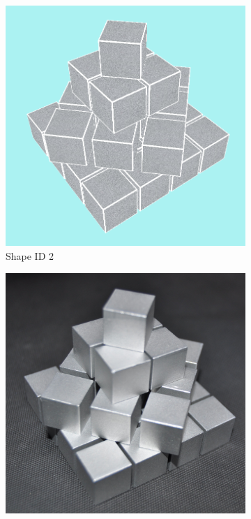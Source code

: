 \begin{figure}[!ht]
	\centering
	\begin{subfigure}{.29167\textwidth}
		\centering
		\includegraphics[width=.95\linewidth]{figures/qtp1-shape2-model.png}
		\caption{Shape ID 2}
		\label{fig:qtp1-shape2-model}
	\end{subfigure}%
	\begin{subfigure}{.29167\textwidth}
		\centering
		\includegraphics[width=.95\linewidth]{figures/qtp1-shape2.jpg}

\end{subfigure}
\end{figure}
